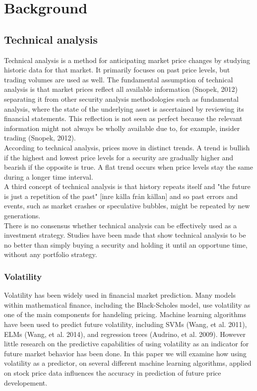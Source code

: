 \documentclass{article}
\begin{document}
\section{Background}
\subsection{Technical analysis}
Technical analysis is a method for anticipating market price changes by studying historic data for that market. It primarily focuses on past price levels, but trading volumes are used as well. The fundamental assumption of technical analysis is that market prices reflect all available information (Snopek, 2012) separating it from other security analysis methodologies such as fundamental analysis, where the state of the underlying asset is ascertained by reviewing its financial statements. This reflection is not seen as perfect because the relevant information might not always be wholly available due to, for example, insider trading (Snopek, 2012). 
\\
According to technical analysis, prices move in distinct trends. A trend is bullish if the highest and lowest price levels for a security are gradually higher and bearish if the opposite is true. A flat trend occurs when price levels stay the same during a longer time interval.
\\
A third concept of technical analysis is that history repeats itself and "the future is just a repetition of the past" [inre källa från källan] and so past errors and events, such as market crashes or speculative bubbles, might be repeated by new generations.
\\
There is no consensus whether technical analysis can be effectively used as a investment strategy. Studies have been made that show technical analysis to be no better than simply buying a security and holding it until an opportune time, without any portfolio strategy.

\subsubsection{Volatility}
Volatility has been widely used in financial market prediction. Many models within mathematical finance, including the Black-Scholes model, use volatility as one of the main components for handeling pricing. Machine learning algorithms have been used to predict future volatility, including SVMs (Wang, et al. 2011), ELMs (Wang, et al. 2014), and regression trees (Audrino, et al. 2009).  However little research on the predictive capabilities of using volatility as an indicator for future market behavior has been done. In this paper we will examine how using volatility as a predictor, on several different machine learning algorithms, applied on stock price data influences the accuracy in prediction of future price developement. 
\end{document}
